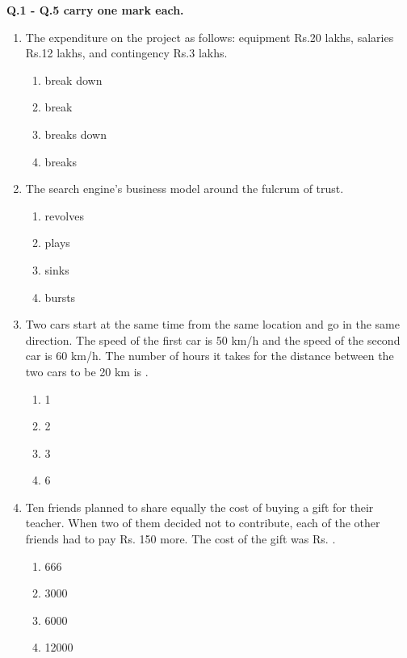 \documentclass[12pt]{article}
\begin{document}
\noindent\textbf{Q.1 - Q.5 carry one mark each.}
\begin{enumerate}[label=Q.\arabic*]
	\item The expenditure on the project \underline{\hspace{2cm}}as follows: equipment Rs.20 lakhs, salaries Rs.12 lakhs, and contingency Rs.3 lakhs.
		\begin{multicols}{2}
			\begin{enumerate}[label=(\Alph*)]
				\item break down
				\item break
				\item breaks down
				\item breaks
			\end{enumerate}
		\end{multicols}

	\item The search engine's business model \underline{\hspace{2cm}} around the fulcrum of trust.
		\begin{multicols}{2}
			\begin{enumerate}[label=(\Alph*)]
				\item revolves
				\item plays
				\item sinks
				\item bursts
			\end{enumerate}
		\end{multicols}

	\item Two cars start at the same time from the same location and go in the same direction. The speed of the first car is 50 km/h and the speed of the second car is 60 km/h. The number of hours it takes for the distance between the two cars to be 20 km is \underline{\hspace{2cm}}.
		\begin{multicols}{2}
			\begin{enumerate}[label=(\Alph*)]
				\item 1
				\item 2
				\item 3
				\item 6
			\end{enumerate}
		\end{multicols}

	\item Ten friends planned to share equally the cost of buying a gift for their teacher. When two of them decided not to contribute, each of the other friends had to pay Rs. 150 more. The cost of the gift was Rs. \underline{\hspace{2cm}}.
		\begin{multicols}{2}
			\begin{enumerate}[label=(\Alph*)]
				\item 666
				\item 3000
				\item 6000
				\item 12000
			\end{enumerate}
		\end{multicols}


\end{enumerate}
\end{document}
